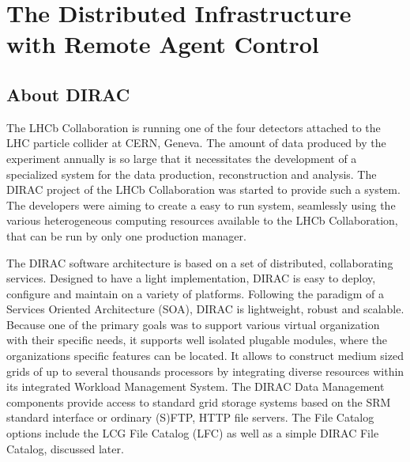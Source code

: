 \chapter{The Distributed Infrastructure with Remote Agent Control}

\section{About DIRAC}
The LHCb Collaboration\cite{LHCb} is running one of the four detectors attached to the LHC particle 
collider at CERN, Geneva. The amount of data produced by the experiment
annually is so large that it necessitates the development of a specialized system for the data
production, reconstruction and analysis. The DIRAC project of the LHCb Collaboration was started to
provide such a system.\cite{Dir2} The developers were aiming to create a easy to run system, seamlessly using 
the various heterogeneous computing resources available to the LHCb Collaboration, that can be run by only one 
production manager. 

The DIRAC software architecture is based on a set of distributed, collaborating services. Designed to have a
light implementation, DIRAC is easy to deploy, configure and maintain on a variety of platforms. Following
the paradigm of a Services Oriented Architecture (SOA), DIRAC is lightweight, robust and scalable. Because one 
of the primary goals was to support various virtual organization with their specific needs, it supports well 
isolated plugable modules, where the organizations specific features can be located. It allows to construct medium
sized grids of up to several thousands processors by integrating diverse resources within its integrated Workload
Management System. The DIRAC Data Management components provide access to standard grid storage systems based 
on the SRM standard interface \cite{SRM} or ordinary (S)FTP, HTTP file servers. The File Catalog options include the
LCG File Catalog (LFC) as well as a simple DIRAC File Catalog, discussed later. 

